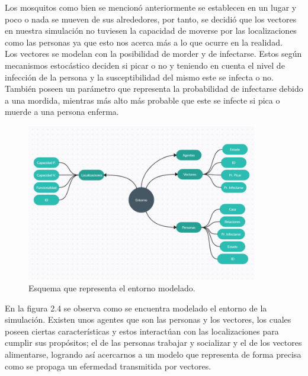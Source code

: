 Los mosquitos como bien se mencionó anteriormente se establecen en un lugar y poco o nada se mueven de 
sus alrededores, por tanto, se decidió que los vectores en nuestra simulación no tuviesen la capacidad de moverse por
las localizaciones como las personas ya que esto nos acerca más a lo que ocurre en la realidad.\\

Los vectores se modelan con la posibilidad de morder y de infectarse. Estos según mecanismos estocástico
deciden si picar o no y teniendo en cuenta el nivel de infección de la persona y la susceptibilidad del mismo este
se infecta o no. También poseen un parámetro que representa la probabilidad de infectarse debido a una mordida, mientras
más alto más probable que este se infecte si pica o muerde a una persona enferma.\\

\begin{figure}[htb]
    \centering
    \includegraphics[width=0.9\textwidth]{Graphics/Pers_Loc_Vec.png}
    \caption{Esquema que representa el entorno modelado.}
\end{figure}
En la figura 2.4 se observa como se encuentra modelado el entorno de la simulación. Existen unos agentes que son las
personas y los vectores, los cuales poseen ciertas características y estos interactúan con las localizaciones para
cumplir sus propósitos; el de las personas trabajar y socializar y el de los vectores alimentarse, logrando así
acercarnos a un modelo que representa de forma precisa como se propaga un efermedad transmitida por vectores.

